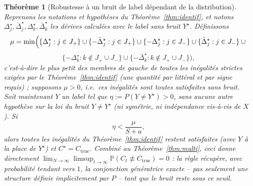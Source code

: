 \documentclass[12pt,a4paper]{article}
\newtheorem{theorem}{Théorème}
\begin{document}
\begin{theorem}[Robustesse à un bruit de label dépendant de la distribution]\label{thm:identif-bruit}
Reprenons les notations et hypothèses du Théorème~\ref{thm:identif}, et
notons $\Delta_j^\star,\bar\Delta_j^\star,\Delta_k^\star,\bar\Delta_k^\star$
les dérives calculées avec le label sans bruit $Y^\star$. Définissons
\[
  \mu = \min\Bigl(
    \{\Delta_j^\star : j\in J_+\} \cup \{-\bar\Delta_j^\star : j\in J_+\} \cup
    \{-\Delta_j^\star : j\in J_-\} \cup \{\bar\Delta_j^\star : j\in J_-\} \cup{}
  \]
  \[
    \{-\Delta_k^\star : k\notin J_+\cup J_-\} \cup \{-\bar\Delta_k^\star : k\notin J_+\cup J_-\}
  \Bigr),
\]
c'est-à-dire le plus petit des membres de gauche de toutes les inégalités
strictes exigées par le Théorème~\ref{thm:identif} (une quantité par
littéral et par signe requis) ; supposons $\mu>0$, i.e.\ ces inégalités
sont toutes satisfaites sans bruit. Soit maintenant $Y$ un label tel que
$\eta:=P(Y\ne Y^\star)>0$, \emph{sans aucune autre hypothèse} sur la loi du
bruit $Y\ne Y^\star$ (ni symétrie, ni indépendance vis-à-vis de $X$). Si
\[
  \boxed{\eta < \frac{\mu}{S+a},}
\]
alors toutes les inégalités du Théorème~\ref{thm:identif} restent
satisfaites (avec $Y$ à la place de $Y^\star$) et $C^\star=C_{\mathrm{true}}$.
Combiné au Théorème~\ref{thm:multi}, ceci donne directement
$\lim_{N\to\infty}\limsup_{t\to\infty}\mathbb P(C_t\not\equiv C_{\mathrm{true}})=0$ :
la règle récupère, avec probabilité tendant vers $1$, la conjonction
génératrice exacte -- pas seulement une structure définie implicitement par
$P$ -- tant que le bruit reste sous ce seuil.
\end{theorem}
\end{document}
